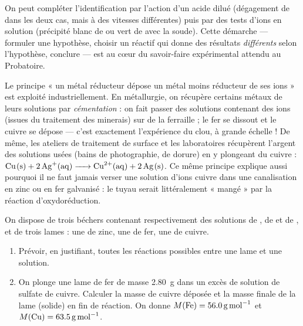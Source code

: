 \documentclass[11pt]{article}
\newcommand{\cle}[1]{{\popxbold\color{popdark}#1}}
\begin{document}
On peut compléter l'identification par l'action d'un acide dilué (dégagement de  dans les deux cas, mais à des vitesses différentes) puis par des tests d'ions en solution (précipité blanc de  ou vert de  avec la soude). Cette démarche — formuler une hypothèse, choisir un réactif qui donne des résultats \emph{différents} selon l'hypothèse, conclure — est au cœur du savoir-faire expérimental attendu au Probatoire.

\begin{savaistu}
Le principe « un métal réducteur dépose un métal moins réducteur de ses ions » est exploité industriellement. En \cle{métallurgie}, on récupère certains métaux de leurs solutions par \emph{cémentation} : on fait passer des solutions contenant des ions  (issues du traitement des minerais) sur de la ferraille ; le fer se dissout et le cuivre se dépose — c'est exactement l'expérience du clou, à grande échelle ! De même, les ateliers de traitement de surface et les laboratoires récupèrent l'\cle{argent} des solutions usées (bains de photographie, de dorure) en y plongeant du cuivre : $\ce{Cu(s) + 2Ag+(aq) -> Cu^2+(aq) + 2Ag(s)}$. Ce même principe explique aussi pourquoi il ne faut jamais verser une solution d'ions cuivre dans une canalisation en zinc ou en fer galvanisé : le tuyau serait littéralement « mangé » par la réaction d'oxydoréduction.
\end{savaistu}

\begin{exercice}
On dispose de trois béchers contenant respectivement des solutions de , de  et de , et de trois lames : une de zinc, une de fer, une de cuivre.
\begin{enumerate}
\item Prévoir, en justifiant, toutes les réactions possibles entre une lame et une solution.
\item On plonge une lame de fer de masse \SI{2,80}{g} dans un excès de solution de sulfate de cuivre. Calculer la masse de cuivre déposée et la masse finale de la lame (solide) en fin de réaction. On donne $M(\ce{Fe}) = \SI{56,0}{g.mol^{-1}}$ et $M(\ce{Cu}) = \SI{63,5}{g.mol^{-1}}$.
\end{enumerate}
\end{exercice}
\end{document}
